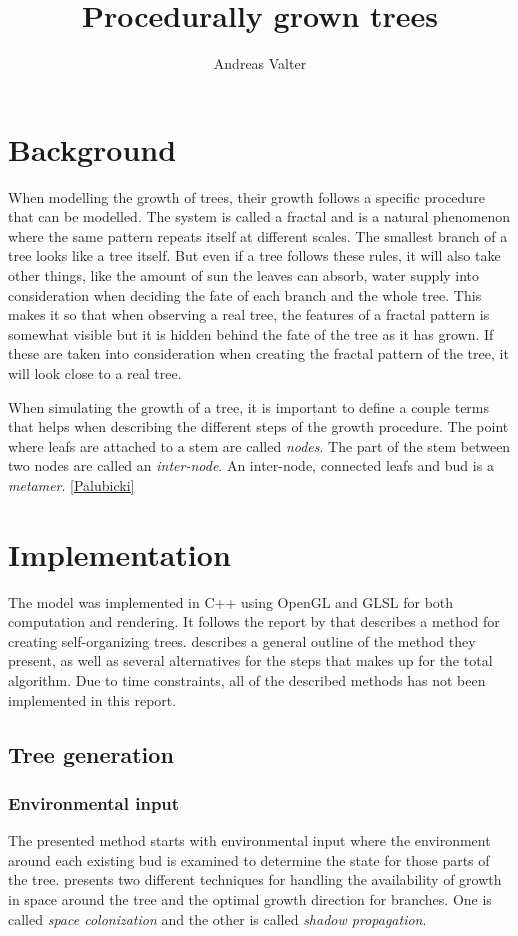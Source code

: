 \documentclass[11pt]{article} %
\title{Procedurally grown trees}
\author{Andreas Valter}
\begin{document}
\maketitle
\section{Background}
When modelling the growth of trees, their growth follows a specific procedure that can be modelled.
The system is called a fractal and is a natural phenomenon where the same pattern repeats itself at different scales.
The smallest branch of a tree looks like a tree itself.
But even if a tree follows these rules, it will also take other things, like the amount of sun the leaves can absorb, water supply into consideration when deciding the fate of each branch and the whole tree.
This makes it so that when observing a real tree, the features of a fractal pattern is somewhat visible but it is hidden behind the fate of the tree as it has grown.
If these are taken into consideration when creating the fractal pattern of the tree, it will look close to a real tree.

When simulating the growth of a tree, it is important to define a couple terms that helps when describing the different steps of the growth procedure.
The point where leafs are attached to a stem are called \emph{nodes}.
The part of the stem between two nodes are called an \emph{inter-node}.
An inter-node, connected leafs and bud is a \emph{metamer}.
\ref{Palubicki}

\section{Implementation}
The model was implemented in C++ using OpenGL and GLSL for both computation and rendering.
It follows the report by \citet{Palubicki} that describes a method for creating self-organizing trees.
\citet{Palubicki} describes a general outline of the method they present, as well as several alternatives for the steps that makes up for the total algorithm.
Due to time constraints, all of the described methods has not been implemented in this report.

\subsection{Tree generation}


\subsubsection{Environmental input}
The presented method starts with environmental input where the environment around each existing bud is examined to determine the state for those parts of the tree.
\citet{Palubicki} presents two different techniques for handling the availability of growth in space around the tree and the optimal growth direction for branches.
One is called \emph{space colonization} and the other is called \emph{shadow propagation}.
\end{document}
